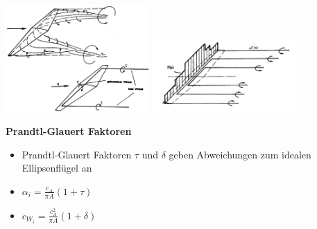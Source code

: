 \documentclass[8pt, landscape, fleqn]{scrartcl}
\begin{document}
\begin{multicols*}{3}
\begin{center}
    \includegraphics[width=5.5cm]{images/Wirbelsystem_einfaches_Hufeisenmodell.png}
    \includegraphics[width=5.5cm]{images/Prandtl_Wirbelmodell.png}
\end{center}

\textbf{Prandtl-Glauert Faktoren}

\begin{itemize}
    \item Prandtl-Glauert Faktoren $\tau$ und $\delta$ geben Abweichungen zum idealen Ellipsenflügel an 
    \item $\alpha_i = \frac{c_A}{\pi A}(1+\tau)$
    \item $c_{W_i} = \frac{c_A^2}{\pi A}(1+\delta)$
\end{itemize}


\end{multicols*}
\end{document}
